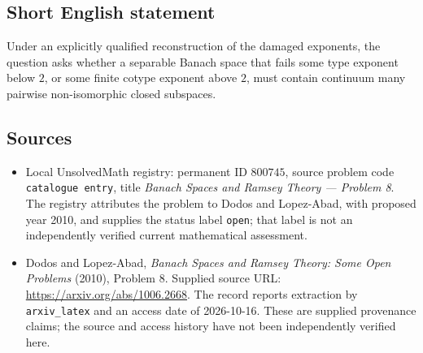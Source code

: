 \documentclass[11pt]{article}
\begin{document}
\subsection{Short English statement}
Under an explicitly qualified reconstruction of the damaged exponents, the question asks whether a separable Banach space that fails some type exponent below \(2\), or some finite cotype exponent above \(2\), must contain continuum many pairwise non-isomorphic closed subspaces.
\subsection{Sources}
\begin{itemize}
\item Local UnsolvedMath registry: permanent ID \(800745\), source problem code \texttt{catalogue entry}, title \emph{Banach Spaces and Ramsey Theory --- Problem 8}. The registry attributes the problem to Dodos and Lopez-Abad, with proposed year 2010, and supplies the status label \texttt{open}; that label is not an independently verified current mathematical assessment.
\item Dodos and Lopez-Abad, \emph{Banach Spaces and Ramsey Theory: Some Open Problems} (2010), Problem 8. Supplied source URL: \url{https://arxiv.org/abs/1006.2668}. The record reports extraction by \texttt{arxiv\_latex} and an access date of 2026-10-16. These are supplied provenance claims; the source and access history have not been independently verified here.
\end{itemize}
\end{document}
